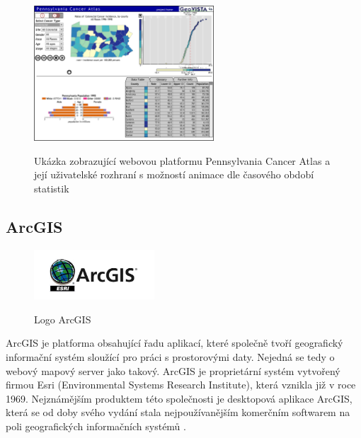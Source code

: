 \begin{figure}[h!]  \centering
\includegraphics[width=0.6\textwidth]{./img/pennsylvania-cancer-atlas.png}
	\caption{Ukázka zobrazující webovou platformu Pennsylvania
Cancer Atlas a její uživatelské rozhraní s možností animace dle
časového období statistik}
	\cite{cancer-atlas}
	\label{fig:cancer-atlas}
\end{figure}
 
\newpage

\subsection{ArcGIS}

\begin{figure}[h!]  \centering
\includegraphics[width=0.4\textwidth]{./img/arcgis-logo.jpg}
	\caption{Logo ArcGIS}
	\cite{arcgis-logo}
	\label{fig:arcgis-logo}
\end{figure} \bigskip

ArcGIS je platforma obsahující řadu aplikací, které společně tvoří
geografický informační systém sloužící pro práci s prostorovými
daty. Nejedná se tedy o webový mapový server jako takový. ArcGIS je
proprietární systém vytvořený firmou Esri (Environmental Systems Research
Institute), která vznikla již v roce 1969. Nejznámějším produktem této společnosti je desktopová aplikace ArcGIS, která
se od doby svého vydání stala nejpoužívanějším komerčním softwarem na poli geografických informačních systémů \cite{arcgis-wiki}.

